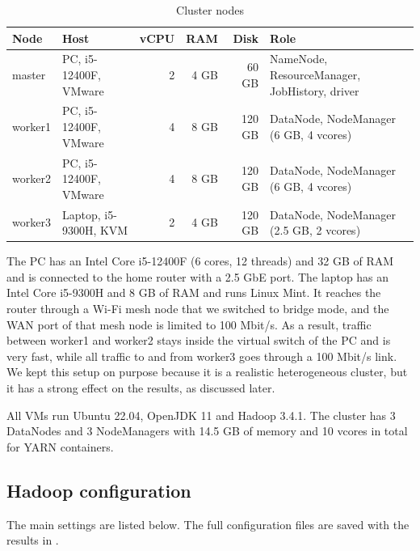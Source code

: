 \documentclass[11pt,a4paper]{article}
\begin{document}
\begin{table}[H]
  \centering
  \small
  \caption{Cluster nodes}
  \begin{tabularx}{\linewidth}{llrrrX}
  \toprule
  \textbf{Node} & \textbf{Host} & \textbf{vCPU} & \textbf{RAM} & \textbf{Disk} & \textbf{Role} \\
  \midrule
  master & PC, i5-12400F, VMware & 2 & 4 GB & 60 GB & NameNode, ResourceManager, JobHistory, driver \\
  worker1 & PC, i5-12400F, VMware & 4 & 8 GB & 120 GB & DataNode, NodeManager (6 GB, 4 vcores) \\
  worker2 & PC, i5-12400F, VMware & 4 & 8 GB & 120 GB & DataNode, NodeManager (6 GB, 4 vcores) \\
  worker3 & Laptop, i5-9300H, KVM & 2 & 4 GB & 120 GB & DataNode, NodeManager (2.5 GB, 2 vcores) \\
  \bottomrule
  \end{tabularx}
\end{table}

The PC has an Intel Core i5-12400F (6 cores, 12 threads) and 32 GB of RAM and is connected to the home router with a 2.5 GbE port. The laptop has an Intel Core i5-9300H and 8 GB of RAM and runs Linux Mint. It reaches the router through a Wi-Fi mesh node that we switched to bridge mode, and the WAN port of that mesh node is limited to 100 Mbit/s. As a result, traffic between worker1 and worker2 stays inside the virtual switch of the PC and is very fast, while all traffic to and from worker3 goes through a 100 Mbit/s link. We kept this setup on purpose because it is a realistic heterogeneous cluster, but it has a strong effect on the results, as discussed later.

All VMs run Ubuntu 22.04, OpenJDK 11 and Hadoop 3.4.1. The cluster has 3 DataNodes and 3 NodeManagers with 14.5 GB of memory and 10 vcores in total for YARN containers.

\subsection{Hadoop configuration}
The main settings are listed below. The full configuration files are saved with the results in .
\end{document}

